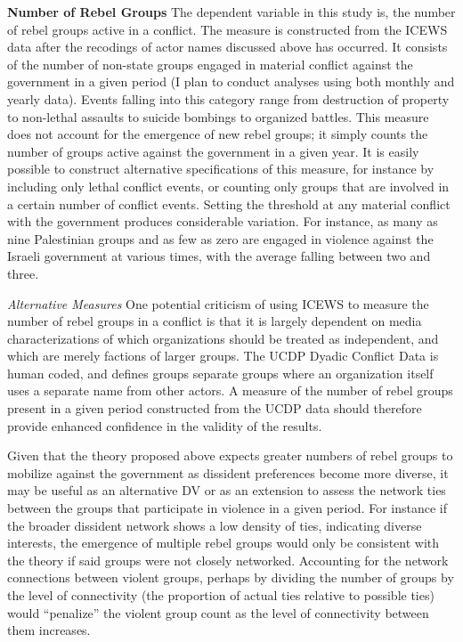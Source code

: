 \textbf{Number of Rebel Groups} The dependent variable in this study is, the number of rebel groups active in a conflict. The measure is constructed from the ICEWS data after the recodings of actor names discussed above has occurred. It consists of the number of non-state groups engaged in material conflict against the government in a given period (I plan to conduct analyses using both monthly and yearly data). Events falling into this category range from destruction of property to non-lethal assaults to suicide bombings to organized battles. This measure does not account for the emergence of new rebel groups; it simply counts the number of groups active against the government in a given year. It is easily possible to construct alternative specifications of this measure, for instance by including only lethal conflict events, or counting only groups that are involved in a certain number of conflict events. Setting the threshold at any material conflict with the government produces considerable variation. For instance, as many as nine Palestinian groups and as few as zero are engaged in violence against the Israeli government at various times, with the average falling between two and three.

\textit{Alternative Measures} One potential criticism of using ICEWS to measure the number of rebel groups in a conflict is that it is largely dependent on media characterizations of which organizations should be treated as independent, and which are merely factions of larger groups. The UCDP Dyadic Conflict Data is human coded, and defines groups separate groups where an organization itself uses a separate name from other actors. A measure of the number of rebel groups present in a given period constructed from the UCDP data should therefore provide enhanced confidence in the validity of the results.

Given that the theory proposed above expects greater numbers of rebel groups to mobilize against the government as dissident preferences become more diverse, it may be useful as an alternative DV or as an extension to assess the network ties between the groups that participate in violence in a given period. For instance if the broader dissident network shows a low density of ties, indicating diverse interests, the emergence of multiple rebel groups would only be consistent with the theory if said groups were not closely networked. Accounting for the network connections between violent groups, perhaps by dividing the number of groups by the level of connectivity (the proportion of actual ties relative to possible ties) would ``penalize'' the violent group count as the level of connectivity between them increases.

